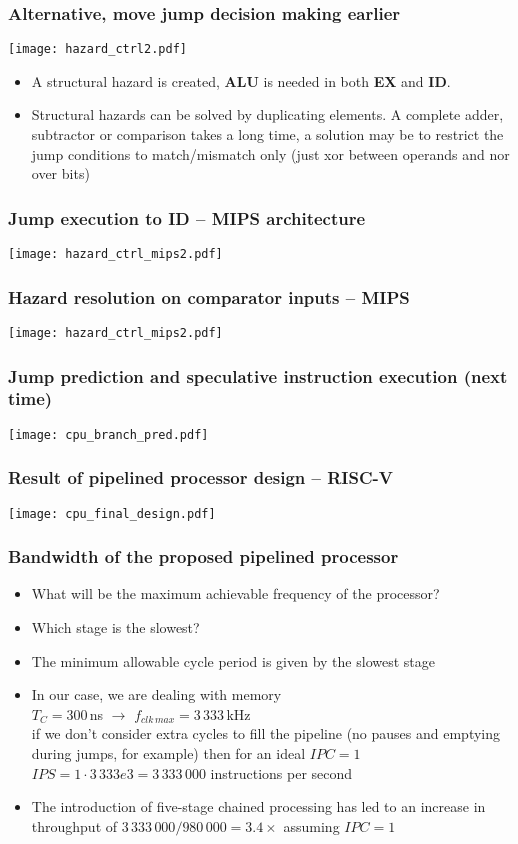 \documentclass{beamer}
\begin{document}
\begin{frame}
\frametitle{Alternative, move jump decision making earlier}
\texttt{[image: hazard\_ctrl2.pdf]}

\begin{itemize}
 \item A structural hazard is created, \textbf{ALU} is needed in both \textbf{EX} and \textbf{ID}.
 \item Structural hazards can be solved by duplicating elements. A complete adder, subtractor or comparison
       takes a long time, a solution may be to restrict the jump conditions to match/mismatch only (just xor
       between operands and nor over bits)
\end{itemize}

\end{frame}

\begin{frame}
\frametitle{Jump execution to ID -- MIPS architecture}
\texttt{[image: hazard\_ctrl\_mips2.pdf]}
\end{frame}

\begin{frame}
\frametitle{Hazard resolution on comparator inputs -- MIPS}
\texttt{[image: hazard\_ctrl\_mips2.pdf]}
\end{frame}

\begin{frame}
\frametitle{Jump prediction and speculative instruction execution (next time)}
\texttt{[image: cpu\_branch\_pred.pdf]}
\end{frame}

\begin{frame}
\frametitle{Result of pipelined processor design -- RISC-V}
\texttt{[image: cpu\_final\_design.pdf]}
\end{frame}

\begin{frame}
\frametitle{Bandwidth of the proposed pipelined processor}

\begin{itemize}
 \item What will be the maximum achievable frequency of the processor?
 \item Which stage is the slowest?
 \item The minimum allowable cycle period is given by the slowest stage
 \item In our case, we are dealing with memory \\
       $T_C = 300$\,ns $\rightarrow$ $f_{clk\,max} = 3\,333$\,kHz \\
       if we don't consider extra cycles to fill the pipeline (no pauses
       and emptying during jumps, for example) then for an ideal $IPC = 1$ \\
       $IPS = 1 \cdot 3\,333e3 = 3\,333\,000$ instructions per second
 \item The introduction of five-stage chained processing has led to an increase in
       throughput of $3\,333\,000 / 980\,000 = 3.4 \times$ assuming $IPC = 1$
\end{itemize}

\end{frame}
\end{document}
